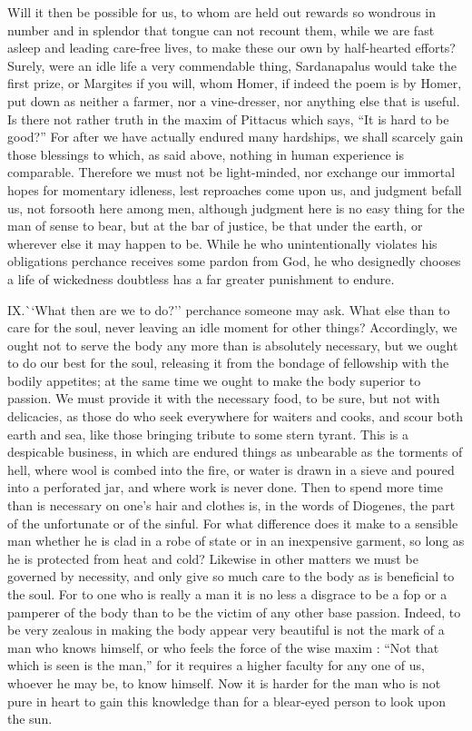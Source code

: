 \documentclass[a4paper]{article}
\begin{document}
Will it then be possible for us, to whom are held out rewards so wondrous in number and in splendor that tongue can not recount them, while we are fast asleep and leading care-free lives, to make these our own by half-hearted efforts? Surely, were an idle life a very commendable thing, Sardanapalus would take the first prize, or Margites if you will, whom Homer, if indeed the poem is by Homer, put down as neither a farmer, nor a vine-dresser, nor anything else that is useful. Is there not rather truth in the maxim of Pittacus which says, ``It is hard to be good?'' For after we have actually endured many hardships, we shall scarcely gain those blessings to which, as said above, nothing in human experience is comparable. Therefore we must not be light-minded, nor exchange our immortal hopes for momentary idleness, lest reproaches come upon us, and judgment befall us, not forsooth here among men, although judgment here is no easy thing for the man of sense to bear, but at the bar of justice, be that under the earth, or wherever else it may happen to be. While he who unintentionally violates his obligations perchance receives some pardon from God, he who designedly chooses a life of wickedness doubtless has a far greater punishment to endure. 

\bigskip

\lettrine[lines=3, findent=3pt, nindent=0pt]{IX.} ``What then are we to do?'' perchance someone may ask. What else than to care for the soul, never leaving an idle moment for other things? Accordingly, we ought not to serve the body any more than is absolutely necessary, but we ought to do our best for the soul, releasing it from the bondage of fellowship with the bodily appetites; at the same time we ought to make the body superior to passion. We must provide it with the necessary food, to be sure, but not with delicacies, as those do who seek everywhere for waiters and cooks, and scour both earth and sea, like those bringing tribute to some stern tyrant. This is a despicable business, in which are endured things as unbearable as the torments of hell, where wool is combed into the fire, or water is drawn in a sieve and poured into a perforated jar, and where work is never done. Then to spend more time than is necessary on one's hair and clothes is, in the words of Diogenes, the part of the unfortunate or of the sinful. For what difference does it make to a sensible man whether he is clad in a robe of state or in an inexpensive garment, so long as he is protected from heat and cold? Likewise in other matters we must be governed by necessity, and only give so much care to the body as is beneficial to the soul. For to one who is really a man it is no less a disgrace to be a fop or a pamperer of the body than to be the victim of any other base passion. Indeed, to be very zealous in making the body appear very beautiful is not the mark of a man who knows himself, or who feels the force of the wise maxim : ``Not that which is seen is the man,'' for it requires a higher faculty for any one of us, whoever he may be, to know himself. Now it is harder for the man who is not pure in heart to gain this knowledge than for a blear-eyed person to look upon the sun. 
\end{document}
